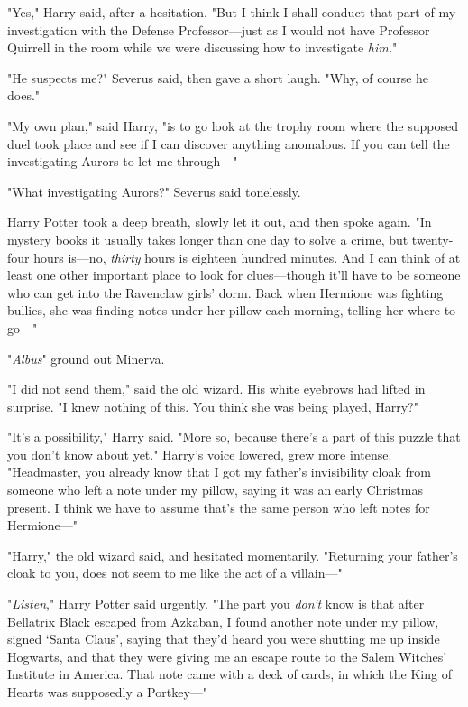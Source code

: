 "Yes," Harry said, after a hesitation. "But I think I shall conduct that part
of my investigation with the Defense Professor---just as I would not have
Professor Quirrell in the room while we were discussing how to investigate
\emph{him.}"

"He suspects me?" Severus said, then gave a short laugh. "Why, of course he
does."

"My own plan," said Harry, "is to go look at the trophy room where the supposed
duel took place and see if I can discover anything anomalous. If you can tell
the investigating Aurors to let me through\mbox{---}"

"What investigating Aurors?" Severus said tonelessly.

Harry Potter took a deep breath, slowly let it out, and then spoke again. "In
mystery books it usually takes longer than one day to solve a crime, but
twenty-four hours is---no, \emph{thirty} hours is eighteen hundred minutes. And
I can think of at least one other important place to look for clues---though
it'll have to be someone who can get into the Ravenclaw girls' dorm. Back when
Hermione was fighting bullies, she was finding notes under her pillow each
morning, telling her where to go\mbox{---}"

"\emph{Albus{\el}}" ground out Minerva.

"I did not send them," said the old wizard. His white eyebrows had lifted in
surprise. "I knew nothing of this. You think she was being played, Harry?"

"It's a possibility," Harry said. "More so, because there's a part of this
puzzle that you don't know about yet." Harry's voice lowered, grew more
intense. "Headmaster, you already know that I got my father's invisibility
cloak from someone who left a note under my pillow, saying it was an early
Christmas present. I think we have to assume that's the same person who left
notes for Hermione\mbox{---}"

"Harry," the old wizard said, and hesitated momentarily. "Returning your
father's cloak to you, does not seem to me like the act of a villain\mbox{---}"

"\emph{Listen}," Harry Potter said urgently. "The part you \emph{don't} know is
that after Bellatrix Black escaped from Azkaban, I found another note under my
pillow, signed `Santa Claus', saying that they'd heard you were shutting me up
inside Hogwarts, and that they were giving me an escape route to the Salem
Witches' Institute in America. That note came with a deck of cards, in which
the King of Hearts was supposedly a Portkey\mbox{---}"

